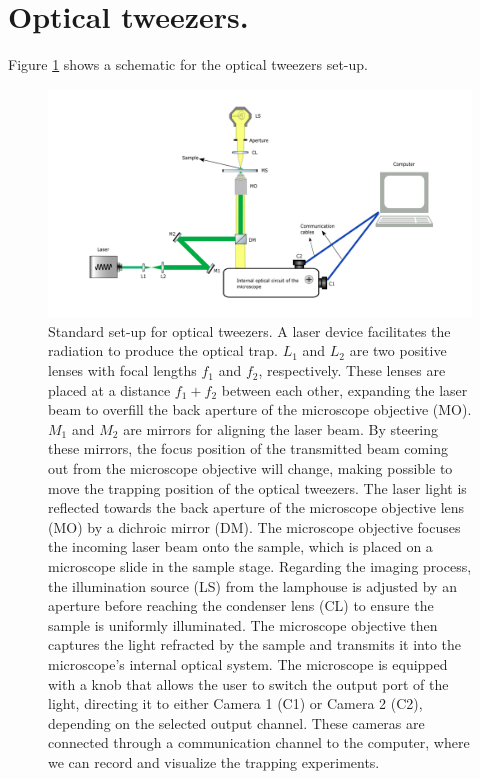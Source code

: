 \documentclass[letterpaper,12pt,oneside]{book}
\begin{document}
\section{Optical tweezers.}
Figure \ref{setuptweezers} shows a schematic for the optical tweezers set-up.  
\begin{figure}[H]
    \centering
    \includegraphics[scale=0.40]{Newplots_microfluidics_results/setup3.png}
    \caption{Standard set-up for optical tweezers. A laser device facilitates the radiation to produce the optical trap. $L_1$ and $L_2$ are two positive lenses with focal lengths $f_1$ and $f_2$, respectively. These lenses are placed at a distance $f_1 +f_2$ between each other, expanding the laser beam to overfill the back aperture of the microscope objective (MO). $ M_1$ and $M_2$ are mirrors for aligning the laser beam. By steering these mirrors, the focus position of the transmitted beam coming out from the microscope objective will change, making possible to move the trapping position of the optical tweezers. The laser light is reflected towards the back aperture of the microscope objective lens (MO) by a dichroic mirror (DM). The microscope objective focuses the incoming laser beam onto the sample, which is placed on a microscope slide in the sample stage. Regarding the imaging process, the illumination source (LS) from the lamphouse is adjusted by an aperture before reaching the condenser lens (CL) to ensure the sample is uniformly illuminated. The microscope objective then captures the light refracted by the sample and transmits it into the microscope's internal optical system. The microscope is equipped with a knob that allows the user to switch the output port of the light, directing it to either Camera 1 (C1) or Camera 2 (C2), depending on the selected output channel. These cameras are connected through a communication channel to the computer, where we can record and visualize the trapping experiments.}
    \label{setuptweezers}
\end{figure}
\end{document}
